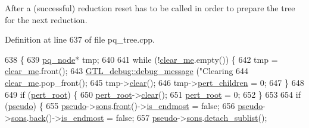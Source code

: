 After a (successful) reduction {\ttfamily reset} has to be called in order to prepare the tree for the next reduction. 



Definition at line 637 of file pq\+\_\+tree.\+cpp.


\begin{DoxyCode}
638 \{
639     \mbox{\hyperlink{classpq__node}{pq\_node}}* tmp;
640     
641     \textcolor{keywordflow}{while} (!\mbox{\hyperlink{classpq__tree_a43bcdb58d91b7e20860f523f49c74fd1}{clear\_me}}.empty()) \{
642     tmp = \mbox{\hyperlink{classpq__tree_a43bcdb58d91b7e20860f523f49c74fd1}{clear\_me}}.front();
643     \mbox{\hyperlink{class_g_t_l__debug_aca4c2fb24203b5fba5e4ffa9c2fa263f}{GTL\_debug::debug\_message}} (\textcolor{stringliteral}{"Clearing %
644     \mbox{\hyperlink{classpq__tree_a43bcdb58d91b7e20860f523f49c74fd1}{clear\_me}}.pop\_front();
645     tmp->\mbox{\hyperlink{classpq__node_a13100e0b030cc047f382d9ddf6a44f4a}{clear}}();
646     tmp->\mbox{\hyperlink{classpq__node_a8d8fb7b3059e7aeecf62eeed34076afb}{pert\_children}} = 0;
647     \}
648     
649     \textcolor{keywordflow}{if} (\mbox{\hyperlink{classpq__tree_adf0d16ca5a29bfbe863efb525135ac01}{pert\_root}}) \{   
650     \mbox{\hyperlink{classpq__tree_adf0d16ca5a29bfbe863efb525135ac01}{pert\_root}}->\mbox{\hyperlink{classpq__node_a13100e0b030cc047f382d9ddf6a44f4a}{clear}}();
651     \mbox{\hyperlink{classpq__tree_adf0d16ca5a29bfbe863efb525135ac01}{pert\_root}} = 0;
652     \}
653     
654     \textcolor{keywordflow}{if} (\mbox{\hyperlink{classpq__tree_a036ce0ebe9f5129d5c4ad930bbcc3e6f}{pseudo}}) \{
655     \mbox{\hyperlink{classpq__tree_a036ce0ebe9f5129d5c4ad930bbcc3e6f}{pseudo}}->\mbox{\hyperlink{classpq__node_a2cc030cfa4560872acea8b50ebd0542b}{sons}}.\mbox{\hyperlink{classsymlist_afd4b55616fc20033d4a47684551866e8}{front}}()->\mbox{\hyperlink{classpq__node_a058dda3d1197dfd2b343d1983d305d79}{is\_endmost}} = \textcolor{keyword}{false};
656     \mbox{\hyperlink{classpq__tree_a036ce0ebe9f5129d5c4ad930bbcc3e6f}{pseudo}}->\mbox{\hyperlink{classpq__node_a2cc030cfa4560872acea8b50ebd0542b}{sons}}.\mbox{\hyperlink{classsymlist_abc0570ff78ded9210ac26865519d36e3}{back}}()->\mbox{\hyperlink{classpq__node_a058dda3d1197dfd2b343d1983d305d79}{is\_endmost}} = \textcolor{keyword}{false};
657     \mbox{\hyperlink{classpq__tree_a036ce0ebe9f5129d5c4ad930bbcc3e6f}{pseudo}}->\mbox{\hyperlink{classpq__node_a2cc030cfa4560872acea8b50ebd0542b}{sons}}.\mbox{\hyperlink{classsymlist_a784f81bf9dfbfc1865f188a82681779f}{detach\_sublist}}();
}
\end{DoxyCode}
